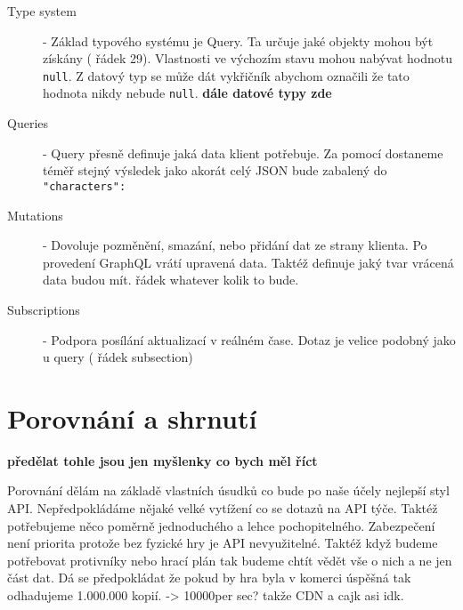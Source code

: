 \begin{description}
    \item[Type system] - Základ typového systému je Query. Ta určuje jaké objekty mohou být získány ( řádek 29). Vlastnosti ve výchozím stavu mohou nabývat hodnotu \texttt{null}. Z datový typ se může dát vykřičník abychom označili že tato hodnota nikdy nebude \texttt{null}. \textbf{dále datové typy zde}
    \item[Queries] - Query přesně definuje jaká data klient potřebuje. Za pomocí  dostaneme téměř stejný výsledek jako  akorát celý JSON bude zabalený do \texttt{"characters": {}}
    \item[Mutations] - Dovoluje pozměnění, smazání, nebo přidání dat ze strany klienta. Po provedení GraphQL vrátí upravená data. Taktéž definuje jaký tvar vrácená data budou mít.  řádek whatever kolik to bude.
    \item[Subscriptions] - Podpora posílání aktualizací v reálném čase. Dotaz je velice podobný jako u query ( řádek subsection)
\end{description}

\section{Porovnání a shrnutí} %
\textbf{předělat tohle jsou jen myšlenky co bych měl říct}

Porovnání dělám na základě vlastních úsudků co bude po naše účely nejlepší styl API. Nepředpokládáme nějaké velké vytížení co se dotazů na API týče. Taktéž potřebujeme něco poměrně jednoduchého a lehce pochopitelného. Zabezpečení není priorita protože bez fyzické hry je API nevyužitelné. Taktéž když budeme potřebovat protivníky nebo hrací plán tak budeme chtít vědět vše o nich a ne jen část dat. Dá se předpokládat že pokud by hra byla v komerci úspěšná tak odhadujeme 1.000.000 kopií. -> 10000per sec? takže CDN a cajk asi idk.


\endinput
